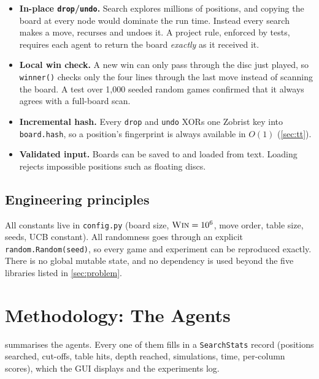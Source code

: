 \documentclass[11pt,a4paper]{article}
\newcommand{\code}[1]{\texttt{\small #1}}
\begin{document}
\begin{itemize}
  \item \textbf{In-place \code{drop}/\code{undo}.} Search explores millions of positions, and copying the board at every node would dominate the run time. Instead every search makes a move, recurses and undoes it. A project rule, enforced by tests, requires each agent to return the board \emph{exactly} as it received it.
  \item \textbf{Local win check.} A new win can only pass through the disc just played, so \code{winner()} checks only the four lines through the last move instead of scanning the board. A test over 1{,}000 seeded random games confirmed that it always agrees with a full-board scan.
  \item \textbf{Incremental hash.} Every \code{drop} and \code{undo} XORs one Zobrist key into \code{board.hash}, so a position's fingerprint is always available in $O(1)$ (\cref{sec:tt}).
  \item \textbf{Validated input.} Boards can be saved to and loaded from text. Loading rejects impossible positions such as floating discs.
\end{itemize}

\subsection{Engineering principles}
All constants live in \code{config.py} (board size, $\textsc{Win}=10^6$, move order, table size, seeds, UCB constant). All randomness goes through an explicit \code{random.Random(seed)}, so every game and experiment can be reproduced exactly. There is no global mutable state, and no dependency is used beyond the five libraries listed in \cref{sec:problem}.

\section{Methodology: The Agents}\label{sec:method}

 summarises the agents. Every one of them fills in a \code{SearchStats} record (positions searched, cut-offs, table hits, depth reached, simulations, time, per-column scores), which the GUI displays and the experiments log.
\end{document}
